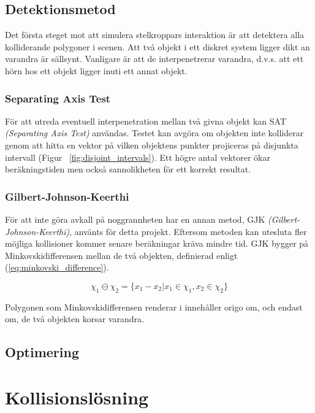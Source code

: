 \documentclass[a4paper,12pt,twocolumn,swedish]{article}
\begin{document}
\subsection{Detektionsmetod}

Det första steget mot att simulera stelkroppars interaktion är att detektera alla kolliderande polygoner i scenen. Att två objekt i ett diskret system ligger dikt an varandra är sällsynt. Vanligare är att de interpenetrerar varandra, d.v.s. att ett hörn hos ett objekt ligger inuti ett annat objekt.

\subsubsection{Separating Axis Test}
För att utreda eventuell interpenetration mellan två givna objekt kan SAT \cite[s.~29]{vella08} \emph{(Separating Axis Test)} användas. Testet kan avgöra om objekten inte kolliderar genom att hitta en vektor på vilken objektens punkter projiceras på disjunkta intervall (Figur ~\ref{fig:disjoint_intervals}). Ett högre antal vektorer ökar beräkningstiden men också sannolikheten för ett korrekt resultat.

\subsubsection{Gilbert-Johnson-Keerthi}
För att inte göra avkall på noggrannheten har en annan metod, GJK \cite[s.~30]{vella08} \emph{(Gilbert-Johnson-Keerthi)}, använts för detta projekt. Eftersom metoden kan utesluta fler möjliga kollisioner kommer senare beräkningar kräva mindre tid. GJK bygger på Minkovskidifferensen mellan de två objekten, definierad enligt (\ref{eq:minkovski_difference}).

\begin{equation}\label{eq:minkovski_difference}
\chi_1 \ominus \chi_2 = \{x_1 - x_2|x_1 \in \chi_1, x_2 \in \chi_2\}
\end{equation}

Polygonen som Minkovskidifferensen renderar i innehåller origo om, och endast om, de två objekten korsar varandra.

\subsection{Optimering}
\section{Kollisionslösning}
\end{document}
